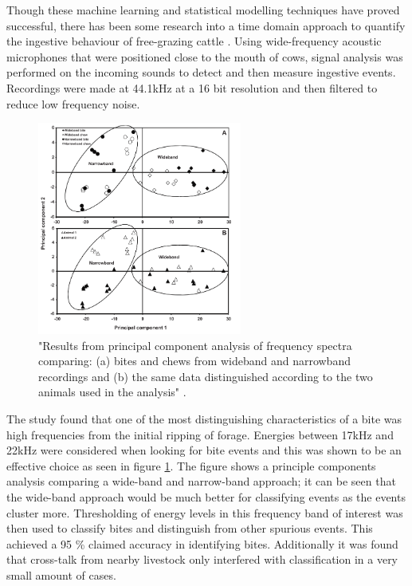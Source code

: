 Though these machine learning and statistical modelling techniques have proved successful, there has been some research into a time domain approach to quantify the ingestive behaviour of free-grazing cattle \cite{Clapham2011}. Using wide-frequency acoustic microphones that were positioned close to the mouth of cows, signal analysis was performed on the incoming sounds to detect and then measure ingestive events. Recordings were made at 44.1kHz at a 16 bit resolution and then filtered to reduce low frequency noise. 

\begin{figure}[H]
\begin{center}
\leavevmode
\includegraphics[width=0.6\textwidth]{images/clapham.png}
\end{center}
\caption{"Results from principal component analysis of frequency spectra comparing: (a) bites and chews from wideband and narrowband recordings and (b) the same data distinguished according to the two animals used in the analysis" \cite{Clapham2011}. }
\label{clapham}
\end{figure}

The study found that one of the most distinguishing characteristics of a bite was high frequencies from the initial ripping of forage. Energies between 17kHz and 22kHz were considered when looking for bite events and this was shown to be an effective choice as seen in figure \ref{clapham}. The figure shows a principle components analysis comparing a wide-band and narrow-band approach; it can be seen that the wide-band approach would be much better for classifying events as the events cluster more. Thresholding of energy levels in this frequency band of interest was then used to classify bites and distinguish from other spurious events. This achieved a 95 \% claimed accuracy in identifying bites. Additionally it was found that cross-talk from nearby livestock only interfered with classification in a very small amount of cases. 


